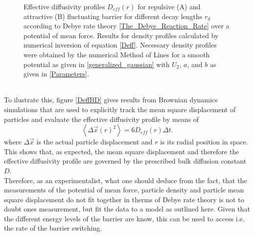 \begin{minipage}[t]{1 \textwidth}
    \begin{figure}[H]
        \caption{Effective diffusivity profiles $D_{eff}(r)$ for repulsive (A) and attractive (B) fluctuating barrier for different decay lengths $r_d$ according to Debye rate theory \ref{The_Debye_Reaction_Rate} over a potential of mean force. Results for density profiles calculated by numerical inversion of equation \eqref{Deff}. Necessary density profiles were obtained by the numerical Method of Lines for a smooth potential as given in \eqref{generalized_gaussian} with $U_2$, $a$, and $b$ as given in \eqref{Parameters}. \label{DeffMOL}}
    \end{figure}
\end{minipage} \vspace{0.5 cm} \\
To ilustrate this, figure \ref{DeffBD} gives results from Brownian dynamics simulations that are used to explicitly track the mean square displacement of particles and evaluate the effective diffusivity profile by means of
\begin{equation}
    \left<\Delta \vec{x}(r)^{2}\right> = 6 D_{eff}(r) \Delta t.
    \label{msqd}
\end{equation}
where $\Delta \vec{x}$ is the actual particle displacement and $r$ is its radial position in space. \\
This shows that, as expected, the mean square displacement and therefore the effective diffusivity profile are governed by the prescribed bulk diffusion constant $D$.\\
Therefore, as an experimentalist, what one should deduce from the fact, that the measurements of the potential of mean force, particle density and particle mean square displacement do not fit together in therms of Debye rate theory is not to doubt ones measurement, but fit the data to a model as outlined here. Given that the different energy levels of the barrier are know, this can be used to access i.e. the rate of the barrier switching.
